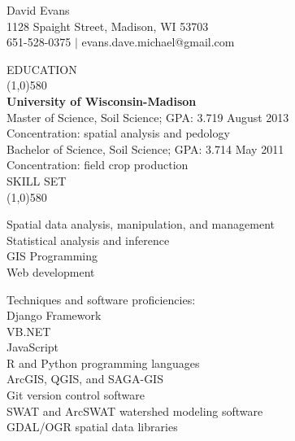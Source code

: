 \documentclass{article}
\begin{document}
\begin{centering}   
\Huge{David Evans} \\
\large{  1128 Spaight Street, Madison, WI 53703 \\
651-528-0375 $|$ evans.dave.michael@gmail.com} \\ 
\bigskip

\onehalfspacing
\end{centering}
\noindent \large{EDUCATION}\\
\line(1,0){580}\\ \normalsize
\textbf{University of Wisconsin-Madison}\\
Master of Science, Soil Science; GPA: 3.719 \hfill August 2013\\
\indent Concentration: spatial analysis and pedology\\
\noindent Bachelor of Science, Soil Science; GPA: 3.714 \hfill May 2011\\
\indent Concentration: field crop production\\

\noindent \large{SKILL SET}\\ 
\line(1,0){580}

\parbox[t][3cm][t]{0.4\textwidth}{
	\textbullet Spatial data analysis, manipulation, and management\\
	\textbullet Statistical analysis and inference\\
	\textbullet GIS Programming\\
	\textbullet Web development\\
} 
\parbox[t][2.5cm][t]{0.07\textwidth}{\hfil}
\parbox[t][3.2cm][t]{0.45\textwidth}{
	Techniques and software proficiencies:\\
	\small{
		\textbullet Django Framework\\
		\textbullet VB.NET\\
		\textbullet JavaScript\\
		\textbullet R and Python programming languages\\
		\textbullet ArcGIS, QGIS, and SAGA-GIS\\
		\textbullet Git version control software\\ %
		\textbullet SWAT and ArcSWAT watershed modeling software\\
		\textbullet GDAL/OGR spatial data libraries\\
	}
}
\end{document}
